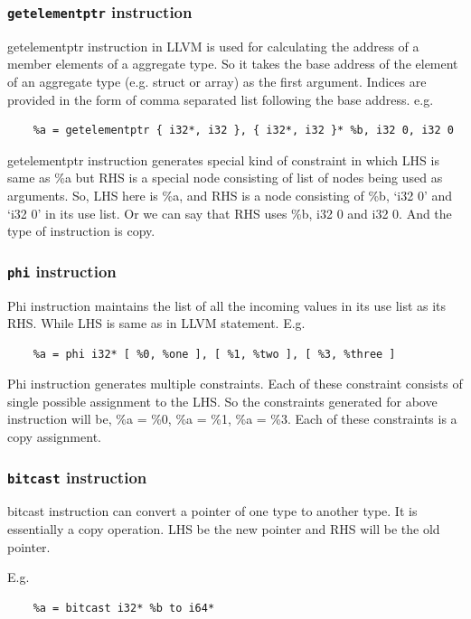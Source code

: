 \documentclass[a4paper,12pt]{report}
\begin{document}
\subsubsection{\texttt{getelementptr} instruction}
getelementptr instruction in LLVM is used for calculating the address 
of a member elements of a aggregate type. So it takes the base address of
the element of an aggregate type (e.g. struct or array) as the first argument.
Indices are provided in the form of comma separated list following the base 
address.
e.g.

\begin{lstlisting}
    %a = getelementptr { i32*, i32 }, { i32*, i32 }* %b, i32 0, i32 0
\end{lstlisting}

getelementptr instruction generates special kind of constraint in which LHS is 
same as \%a but RHS is a special node consisting of list of nodes being used as 
arguments. So, LHS here is \%a, and RHS is a node consisting of \%b, `i32 0' 
and `i32 0' in its use list. Or we can say that RHS uses \%b, i32 0 and i32 0. And 
the type of instruction is copy.

\subsubsection{\texttt{phi} instruction}
Phi instruction maintains the list of all the incoming values in its use list
as its RHS. While LHS is same as in LLVM statement.
E.g.
\begin{lstlisting}
    %a = phi i32* [ %0, %one ], [ %1, %two ], [ %3, %three ]
\end{lstlisting}

Phi instruction generates multiple constraints. Each of these constraint 
consists of single possible assignment to the LHS. So the constraints generated 
for above instruction will be, \%a = \%0, \%a = \%1, \%a = \%3. Each of these 
constraints is a copy assignment.

\subsubsection{\texttt{bitcast} instruction}
bitcast instruction can convert a pointer of one type to another type. It is
essentially a copy operation. LHS be the new pointer and RHS will be the old 
pointer.

E.g.
\begin{lstlisting}
    %a = bitcast i32* %b to i64*
\end{lstlisting}
\end{document}
